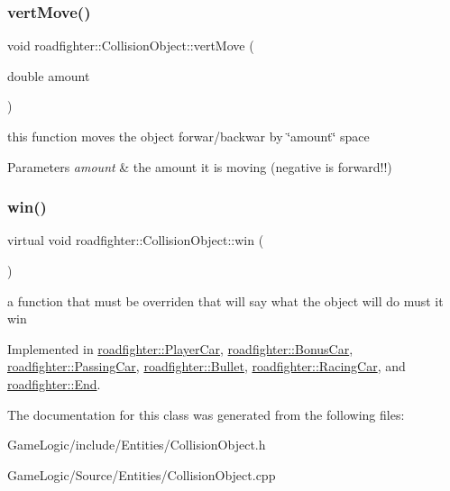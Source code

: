 \mbox{\label{classroadfighter_1_1CollisionObject_aaf92d0fe335daa016b5131835602bc1d}} 
\subsubsection{\texorpdfstring{vert\+Move()}{vertMove()}}
{\footnotesize\ttfamily void roadfighter\+::\+Collision\+Object\+::vert\+Move (\begin{DoxyParamCaption}\item[{double}]{amount }\end{DoxyParamCaption})}

this function moves the object forwar/backwar by \char`\"{}amount\char`\"{} space 
\begin{DoxyParams}{Parameters}
{\em amount} & the amount it is moving (negative is forward!!) \\
\hline
\end{DoxyParams}
\mbox{\label{classroadfighter_1_1CollisionObject_a03ce1ae52676088839d85c597743052c}} 
\subsubsection{\texorpdfstring{win()}{win()}}
{\footnotesize\ttfamily virtual void roadfighter\+::\+Collision\+Object\+::win (\begin{DoxyParamCaption}{ }\end{DoxyParamCaption})\hspace{0.3cm}{\ttfamily [pure virtual]}}

a function that must be overriden that will say what the object will do must it win 

Implemented in \hyperlink{classroadfighter_1_1PlayerCar_a12f0da24565a4fe64a7bf17fc7c37152}{roadfighter\+::\+Player\+Car}, \hyperlink{classroadfighter_1_1BonusCar_afb2d142de799694db896ba875d7d0c27}{roadfighter\+::\+Bonus\+Car}, \hyperlink{classroadfighter_1_1PassingCar_a365d8befb1c2fd34337fc25665ccc73f}{roadfighter\+::\+Passing\+Car}, \hyperlink{classroadfighter_1_1Bullet_a566adb0235665312365cd65536c2aafc}{roadfighter\+::\+Bullet}, \hyperlink{classroadfighter_1_1RacingCar_a24293ac56920da01d29fe99aee8d3ea6}{roadfighter\+::\+Racing\+Car}, and \hyperlink{classroadfighter_1_1End_abcf20b9e8a2dda73a9215eb8c01c4aef}{roadfighter\+::\+End}.



The documentation for this class was generated from the following files\+:\begin{DoxyCompactItemize}
\item 
Game\+Logic/include/\+Entities/Collision\+Object.\+h\item 
Game\+Logic/\+Source/\+Entities/Collision\+Object.\+cpp\end{DoxyCompactItemize}
